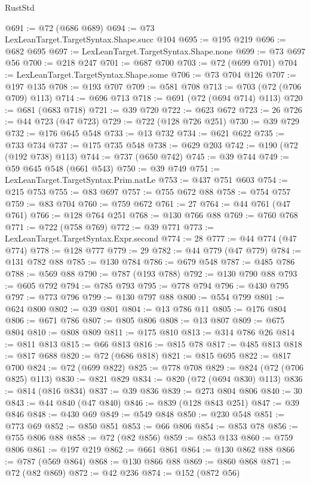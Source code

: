 \begin{lexlean}{RustStd}
\begin{coremodule}
@691 := @72 (@686 @689)
@694 := @73 LexLeanTarget.TargetSyntax.Shape.succ @104
@695 := @195 @219
@696 := @682 @695
@697 := LexLeanTarget.TargetSyntax.Shape.none
@699 := @73 @697 @56
@700 := @218 @247
@701 := @687 @700
@703 := @72 (@699 @701)
@704 := LexLeanTarget.TargetSyntax.Shape.some
@706 := @73 @704 @126
@707 := @197 @135
@708 := @193 @707
@709 := @581 @708
@713 := @703 (@72 (@706 @709) @113)
@714 := @696 @713
@718 := @691 (@72 (@694 @714) @113)
@720 := @681 (@683 @718)
@721 := @39 @720
@722 := @623 @672
@723 := 26
@726 := @44 @723 (@47 @723)
@729 := @722 (@128 @726 @251)
@730 := @39 @729
@732 := @176 @645 @548
@733 := @13 @732
@734 := @621 @622
@735 := @733 @734
@737 := @175 @735 @548
@738 := @629 @203
@742 := @190 (@72 (@192 @738) @113)
@744 := @737 (@650 @742)
@745 := @39 @744
@749 := @59 @645 @548 (@661 @543)
@750 := @39 @749
@751 := LexLeanTarget.TargetSyntax.Prim.natLe
@753 := @437 @751 @603
@754 := @215 @753
@755 := @83 @697
@757 := @755 @672 @88
@758 := @754 @757
@759 := @83 @704
@760 := @759 @672
@761 := 27
@764 := @44 @761 (@47 @761)
@766 := @128 @764 @251
@768 := @130 @766 @88
@769 := @760 @768
@771 := @722 (@758 @769)
@772 := @39 @771
@773 := LexLeanTarget.TargetSyntax.Expr.second
@774 := 28
@777 := @44 @774 (@47 @774)
@778 := @128 @777
@779 := 29
@782 := @44 @779 (@47 @779)
@784 := @131 @782 @88
@785 := @130 @784
@786 := @679 @548
@787 := @485 @786
@788 := @569 @88
@790 := @787 (@193 @788)
@792 := @130 @790 @88
@793 := @605 @792
@794 := @785 @793
@795 := @778 @794
@796 := @430 @795
@797 := @773 @796
@799 := @130 @797 @88
@800 := @554 @799
@801 := @624 @800
@802 := @39 @801
@804 := @13 @786 @11
@805 := @176 @804
@806 := @671 @786
@807 := @805 @806
@808 := @13 @807
@809 := @675 @804
@810 := @808 @809
@811 := @175 @810
@813 := @314 @786 @26
@814 := @811 @813
@815 := @66 @813
@816 := @815 @78
@817 := @485 @813
@818 := @817 @688
@820 := @72 (@686 @818)
@821 := @815 @695
@822 := @817 @700
@824 := @72 (@699 @822)
@825 := @778 @708
@829 := @824 (@72 (@706 @825) @113)
@830 := @821 @829
@834 := @820 (@72 (@694 @830) @113)
@836 := @814 (@816 @834)
@837 := @39 @836
@839 := @273 @804 @806
@840 := 30
@843 := @44 @840 (@47 @840)
@846 := @839 (@128 @843 @251)
@847 := @39 @846
@848 := @430 @69
@849 := @549 @848
@850 := @230 @548
@851 := @773 @69
@852 := @850 @851
@853 := @66 @806
@854 := @853 @78
@856 := @755 @806 @88
@858 := @72 (@82 @856)
@859 := @853 @133
@860 := @759 @806
@861 := @197 @219
@862 := @661 @861
@864 := @130 @862 @88
@866 := @787 (@569 @864)
@868 := @130 @866 @88
@869 := @860 @868
@871 := @72 (@82 @869)
@872 := @42 @236
@874 := @152 (@872 @56)

\end{coremodule}
\end{lexlean}
